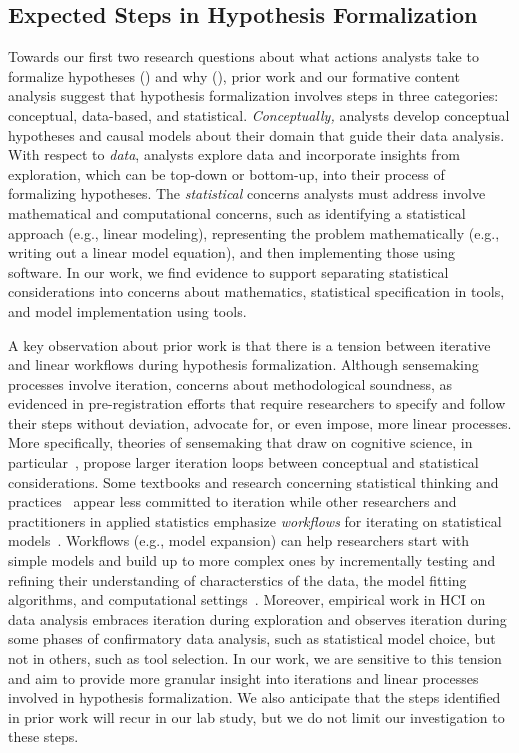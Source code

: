\subsection{Expected Steps in Hypothesis Formalization}
Towards our first two research questions about what actions analysts take to
formalize hypotheses (\rqSteps) and why (\rqProcess), prior work and our
formative content analysis suggest that hypothesis formalization involves steps
in three categories: conceptual, data-based, and statistical.
\textit{Conceptually,} analysts develop conceptual hypotheses and causal models
about their domain that guide their data analysis. With respect to
\textit{data}, analysts explore data and incorporate insights from exploration,
which can be top-down or bottom-up, into their process of formalizing
hypotheses. The \textit{statistical} concerns analysts must address involve
mathematical and computational concerns, such as identifying a statistical
approach (e.g., linear modeling), representing the problem mathematically (e.g.,
writing out a linear model equation), and then implementing those using
software. In our work, we find evidence to support separating statistical
considerations into concerns about mathematics, statistical specification in
tools, and model implementation using tools.

A key observation about prior work is that there is a tension between iterative
and linear workflows during hypothesis formalization. Although sensemaking
processes involve iteration, concerns about methodological soundness, as
evidenced in pre-registration efforts that require researchers to specify and
follow their steps without deviation, advocate for, or even impose, more linear
processes. More specifically, theories of sensemaking that draw on cognitive
science, in particular~\cite{russell1993cost,grolemund2014cognitive}, propose
larger iteration loops between conceptual and statistical considerations. Some
textbooks and research concerning statistical thinking and
practices~\cite{wild1999statisticalThinking,carver2016guidelines} appear less
committed to iteration while other researchers and practitioners in applied
statistics emphasize \textit{workflows} for iterating on statistical
models~\cite{yu2020veridical,lee2019robust,gelman2013bayesianTextbook}.
Workflows (e.g., model expansion) can help researchers start with simple models and build up to more
complex ones by incrementally testing and refining their
understanding of characterstics of the data, the model fitting algorithms, and
computational settings~\cite{betancourt2020bayesianWorkflow,gelman2020bayesianWorkflow,gabry2019visualization}. Moreover, empirical work in HCI on data analysis embraces
iteration during exploration and observes iteration during some phases of
confirmatory data analysis, such as statistical model choice, but not in others,
such as tool selection. In our work, we are sensitive to this tension and aim to
provide more granular insight into iterations and linear processes involved in
hypothesis formalization. We also anticipate that the steps identified in prior
work will recur in our lab study, but we do not limit our investigation to these
steps. 